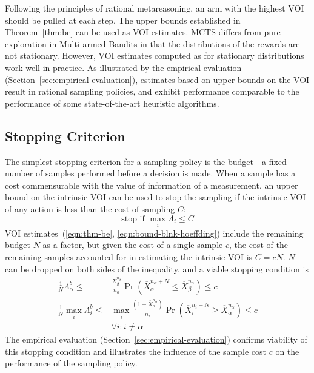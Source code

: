 \documentclass[]{article}
\begin{document}
Following the principles of rational metareasoning, an arm with the
highest VOI should be pulled at each step. The upper bounds
established in Theorem~\ref{thm:be} can be used as VOI estimates. MCTS
differs from pure exploration in Multi-armed Bandits in that the
distributions of the rewards are not stationary. However, VOI
estimates computed as for stationary distributions work well in
practice. As illustrated
by the empirical evaluation (Section~\ref{sec:empirical-evaluation}),
estimates based on upper bounds on the VOI result in rational sampling
policies, and exhibit performance comparable to the performance of
some state-of-the-art heuristic algorithms.

\subsection{Stopping Criterion}
\label{sec:control-stopping-criterion}

The simplest stopping criterion for a sampling policy is the
budget---a fixed number of samples performed before a decision is
made. When a sample has a cost commensurable with the value of
information of a measurement, an upper bound on the intrinsic VOI can
be used to stop the sampling if the intrinsic VOI of any action
is less than the cost of sampling $C$:
\begin{equation}
\mbox{stop if } \max_i \Lambda_i \le C
\end{equation}
VOI estimates~(\ref{eqn:thm-be},
\ref{eqn:bound-blnk-hoeffding}) include the remaining budget $N$ as a
factor, but given the cost of a single sample $c$, the cost of the
remaining samples accounted for in estimating the intrinsic VOI is
$C=cN$. $N$ can be dropped on both sides of the inequality,
and a viable stopping condition is
\begin{align}
\frac 1 N \Lambda_\alpha^b \le&\frac {\overline X_\beta^{n_\beta}}
  {n_\alpha}\Pr(\overline X_\alpha^{n_\alpha+N}\le\overline
  X_\beta^{n_\alpha})\le c\nonumber\\
\frac 1 N \max_i\Lambda_i^b\le &\max_i\frac {(1-\overline X_\alpha^{n_\alpha})} {n_i}\Pr(\overline
  X_i^{n_i+N}\ge\overline X_\alpha^{n_\alpha})\le c\nonumber\\
    &\forall i: i\ne\alpha
\label{eqn:stopping-blnk}
\end{align}
The empirical evaluation (Section~\ref{sec:empirical-evaluation})
confirms viability of this stopping condition and illustrates the
influence of the sample cost $c$ on the performance of
the sampling policy.
\end{document}
